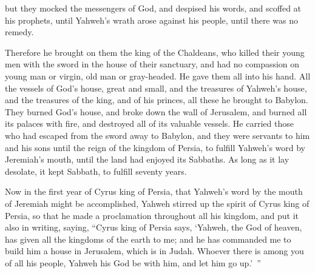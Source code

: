 {but they mocked the messengers of God, and despised his words, and scoffed at his prophets, until Yahweh’s wrath arose against his people, until there was no remedy.
\par }{\PP {}Therefore he brought on them the king of the Chaldeans, who killed their young men with the sword in the house of their sanctuary, and had no compassion on young man or virgin, old man or gray-headed. He gave them all into his hand.
All the vessels of God’s house, great and small, and the treasures of Yahweh’s house, and the treasures of the king, and of his princes, all these he brought to Babylon.
They burned God’s house, and broke down the wall of Jerusalem, and burned all its palaces with fire, and destroyed all of its valuable vessels.
He carried those who had escaped from the sword away to Babylon, and they were servants to him and his sons until the reign of the kingdom of Persia,
to fulfill Yahweh’s word by Jeremiah’s mouth, until the land had enjoyed its Sabbaths. As long as it lay desolate, it kept Sabbath, to fulfill seventy years.
\par }{\PP {}Now in the first year of Cyrus king of Persia, that Yahweh’s word by the mouth of Jeremiah might be accomplished, Yahweh stirred up the spirit of Cyrus king of Persia, so that he made a proclamation throughout all his kingdom, and put it also in writing, saying,
“Cyrus king of Persia says, ‘Yahweh, the God of heaven, has given all the kingdoms of the earth to me; and he has commanded me to build him a house in Jerusalem, which is in Judah. Whoever there is among you of all his people, Yahweh his God be with him, and let him go up.’ ”
\par }